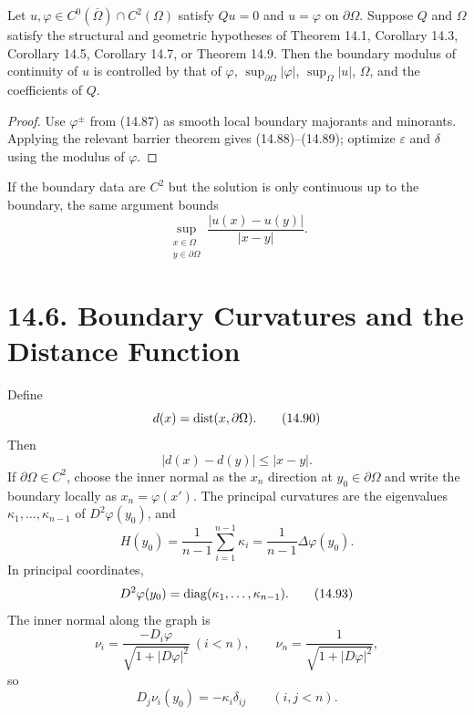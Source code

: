 \begin{theorem}
\label{gt14-boundary-gradient-14-15}
Let $u,\varphi\in C^0(\overline\Omega)\cap C^2(\Omega)$ satisfy $Qu=0$ and
$u=\varphi$ on $\partial\Omega$. Suppose $Q$ and $\Omega$ satisfy the structural
and geometric hypotheses of Theorem 14.1, Corollary 14.3, Corollary 14.5,
Corollary 14.7, or Theorem 14.9. Then the boundary modulus of continuity of
$u$ is controlled by that of $\varphi$, $\sup_{\partial\Omega}|\varphi|$,
$\sup_\Omega|u|$, $\Omega$, and the coefficients of $Q$.
\end{theorem}
\begin{proof}
\sketch Use $\varphi^\pm$ from (14.87) as smooth local boundary majorants and
minorants. Applying the relevant barrier theorem gives (14.88)--(14.89);
optimize $\varepsilon$ and $\delta$ using the modulus of $\varphi$.
\end{proof}

If the boundary data are $C^2$ but the solution is only continuous up to the
boundary, the same argument bounds
\[
\sup_{\substack{x\in\Omega\\y\in\partial\Omega}}
\frac{|u(x)-u(y)|}{|x-y|}.
\]

\section*{14.6. Boundary Curvatures and the Distance Function}

Define
\begin{equation}
d(x)=\operatorname{dist}(x,\partial\Omega).
\tag{14.90}
\end{equation}
Then
\begin{equation}
|d(x)-d(y)|\leq|x-y|.
\tag{14.91}
\end{equation}
If $\partial\Omega\in C^2$, choose the inner normal as the $x_n$ direction at
$y_0\in\partial\Omega$ and write the boundary locally as
$x_n=\varphi(x')$. The principal curvatures are the eigenvalues
$\kappa_1,\ldots,\kappa_{n-1}$ of $D^2\varphi(y_0)$, and
\begin{equation}
H(y_0)=\frac1{n-1}\sum_{i=1}^{n-1}\kappa_i
=\frac1{n-1}\Delta\varphi(y_0).
\tag{14.92}
\end{equation}
In principal coordinates,
\begin{equation}
D^2\varphi(y_0)=\operatorname{diag}(\kappa_1,\ldots,\kappa_{n-1}).
\tag{14.93}
\end{equation}
The inner normal along the graph is
\begin{equation}
\nu_i=\frac{-D_i\varphi}{\sqrt{1+|D\varphi|^2}}\ (i<n),
\qquad
\nu_n=\frac1{\sqrt{1+|D\varphi|^2}},
\tag{14.94}
\end{equation}
so
\begin{equation}
D_j\nu_i(y_0)=-\kappa_i\delta_{ij}
\qquad(i,j<n).
\tag{14.95}
\end{equation}

